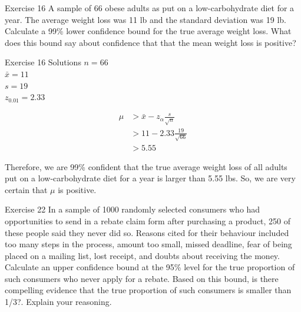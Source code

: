 \documentclass[
  ignorenonframetext,
]{beamer}
\begin{document}
\begin{frame}{Exercise 16}
\protect\hypertarget{exercise-16}{}
A sample of 66 obese adults as put on a low-carbohydrate diet for a
year. The average weight loss was 11 lb and the standard deviation was
19 lb. Calculate a 99\% lower confidence bound for the true average
weight loss. What does this bound say about confidence that that the
mean weight loss is positive?
\end{frame}

\begin{frame}{Exercise 16 Solutions}
\protect\hypertarget{exercise-16-solutions}{}
\(n = 66\)\\
\(\bar{x} = 11\)\\
\(s = 19\)\\
\(z_{0.01} = 2.33\)

\[
\begin{aligned}
\mu &> \bar{x} - z_{\alpha}\frac{s}{\sqrt{n}} \\ 
&> 11 - 2.33 \frac{19}{\sqrt{66}} \\ 
&> 5.55
\end{aligned}
\]

Therefore, we are 99\% confident that the true average weight loss of
all adults put on a low-carbohydrate diet for a year is larger than 5.55
lbs. So, we are very certain that \(\mu\) is positive.
\end{frame}

\begin{frame}{Exercise 22}
\protect\hypertarget{exercise-22}{}
In a sample of 1000 randomly selected consumers who had opportunities to
send in a rebate claim form after purchasing a product, 250 of these
people said they never did so. Reasons cited for their behaviour
included too many steps in the process, amount too small, missed
deadline, fear of being placed on a mailing list, lost receipt, and
doubts about receiving the money. Calculate an upper confidence bound at
the 95\% level for the true proportion of such consumers who never apply
for a rebate. Based on this bound, is there compelling evidence that the
true proportion of such consumers is smaller than 1/3?. Explain your
reasoning.
\end{frame}
\end{document}
